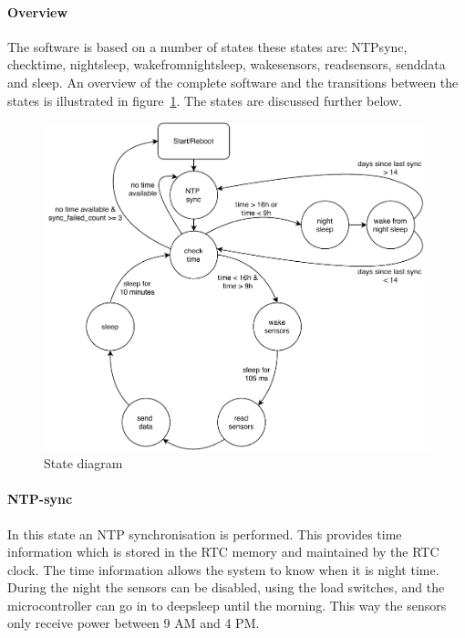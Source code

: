 \documentclass[11pt,a4paper]{article}
\begin{document}
\paragraph{Overview}
The software is based on a number of states these states are: NTPsync, checktime, nightsleep, wakefromnightsleep, wakesensors, readsensors, senddata and sleep. An overview of the complete software and the transitions between the states is illustrated in figure~\ref{fig:statediagram}. The states are discussed further below. 
\begin{figure}[!ht]
	\centering
	\includegraphics[width=1\linewidth]{statendiagram.pdf}
	\caption{State diagram}
	\label{fig:statediagram}
\end{figure}
\paragraph{NTP-sync}
In this state an NTP synchronisation is performed. This provides time information which is stored in the RTC memory and maintained by the RTC clock. The time information allows the system to know when it is night time. During the night the sensors can be disabled, using the load switches, and the microcontroller can go in to deepsleep until the morning. This way the sensors only receive power between 9 AM and 4 PM. 
\end{document}
